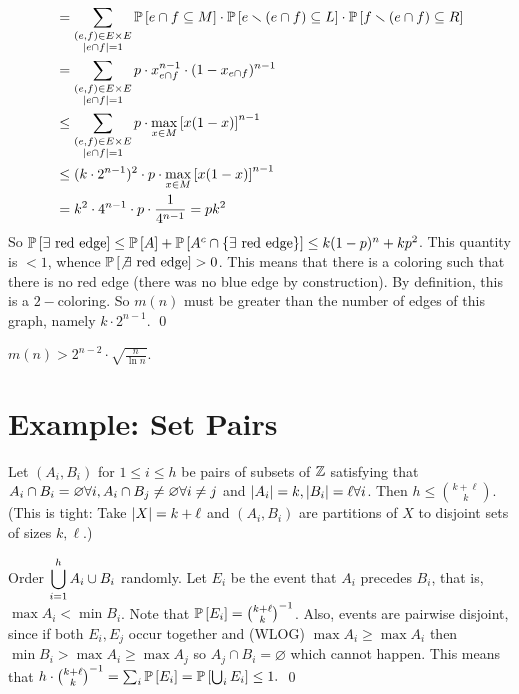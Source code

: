 {\begin{align*}
&= \sum_{\substack{(e,f)\in E\times E\\ \abs {e\cap f}=1}} \P{e\cap f \subseteq M} \cdot\P{e\smallsetminus(e\cap f) \subseteq L} \cdot\P{f\smallsetminus(e\cap f) \subseteq R}\\
&=\sum_{\substack{(e,f)\in E\times E\\ \abs {e\cap f}=1}} p \cdot x_{e\cap f}^{n-1}\cdot (1-x_{e\cap f})^{n-1} \\
&\leq \sum_{\substack{(e,f)\in E\times E\\ \abs {e\cap f}=1}} p \cdot \max_{x\in M}\left[x(1-x)\right]^{n-1} \\
&\leq (k\cdot 2^{n-1})^2 \cdot p \cdot \max_{x\in M}\left[x(1-x)\right]^{n-1}\\
&= k^2 \cdot 4^{n-1}\cdot p\cdot \frac{1}{4^{n-1}} = pk^2
\end{align*}
So $\P{\exists\text{ red edge}} \leq \P A + \P{A^c\cap \set{\exists\text{ red edge}}} \leq k(1-p)^n + kp^2$. This quantity is $<1$, whence $\P{\not\exists\text{ red edge}} >0$. This means that there is a coloring such that there is no red edge (there was no blue edge by construction). By definition, this is a $2-$coloring. So $m(n)$ must be greater than the number of edges of this graph, namely $k\cdot 2^{n-1}$.
\qed}

\begin{cor}
$m(n) > 2^{n-2}\cdot \sqrt{\frac{n}{\ln n}}$.
\end{cor}


\section{Example: Set Pairs}
\begin{thm}[Bollobas] Let $(A_i,B_i)$ for $1\leq i\leq h$ be pairs of subsets of $\Z$ satisfying that $\ds A_i\cap B_i=\varnothing\forall i, A_i\cap B_j\neq \varnothing \forall i\neq j$ and $\abs{A_i}=k,\abs{B_i}=\ell\forall i$. Then $h\leq {k+\ell\choose k}$. \\
(This is tight: Take $\abs{X}=k+\ell$ and $(A_i,B_i)$ are partitions of $X$ to disjoint sets of sizes $k,\ell$.)
\end{thm}

\begin{pf}
Order $\ds\bigcup_{i=1}^h A_i\cup B_i$ randomly. Let $E_i$ be the event that $A_i$ precedes $B_i$, that is, $\max A_i < \min B_i$. Note that $\P{E_i} = {k+\ell\choose k}^{-1}$. Also, events are pairwise disjoint, since if both $E_i,E_j$ occur together and (WLOG) $\max A_i \geq \max A_i$ then $\min B_i > \max A_i \geq \max A_j$ so $A_j\cap B_i=\varnothing$ which cannot happen. This means that $h\cdot {k+\ell\choose k}^{-1}=\sum_i\P{E_i} = \P{\bigcup_i E_i} \leq 1.$
\qed\end{pf}





